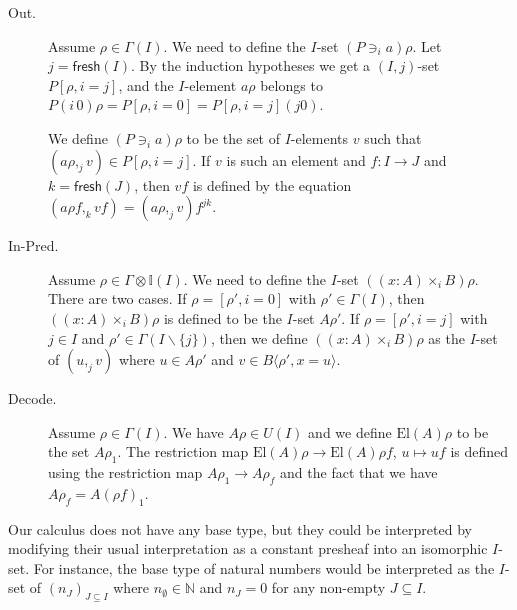 \documentclass[english]{PaperTools/latex/lipics}
\newcommand\CTimes[2]{(#2) ×_{#1}}
\newcommand\op[1]{∋_{#1}}
\def\fresh#1{\mathsf{fresh}(#1)}
\def\El#1{\mathrm{El}(#1)}
\begin{document}
\begin{description}
  \item[\sc Out.]
    Assume $ρ ∈ Γ(I)$. We need to define the $I$-set $(P \op {i} a)ρ$.
    Let $j = \fresh I$.
    By the induction hypotheses we get a $(I,j)$-set $P[ρ,i=j]$,
    and the $I$-element $aρ$ belongs to
    $P(i\,0)ρ = P[ρ,i=0] = P[ρ,i=j](j 0)$.

    We define $(P \op {i} a)ρ$ to be the set of $I$-elements $v$ such that
    $(aρ,_j v) ∈ P[ρ,i=j]$.
    If $v$ is such an element and $f : I → J$ and $k=\fresh J$, then
    $vf$ is defined by the equation $(aρf,_k vf) = (aρ ,_j v)f^{jk}$.


  \item[\sc In-Pred.]
    Assume $ρ ∈ Γ⊗𝕀(I)$.  We need to define the $I$-set $(\CTimes i {x:A} B)ρ$.
    There are two cases.
    If $ρ = [ρ',i=0]$ with $ρ' ∈ Γ(I)$, then $(\CTimes i {x:A} B)ρ$ is
    defined to be the $I$-set $Aρ'$.
    If $ρ = [ρ',i=j]$ with $j ∈ I$ and $ρ' ∈ Γ(I\backslash\{j\})$, then we define
    $(\CTimes i {x:A} B)ρ$ as the $I$-set of $(u ,_j v)$ where
    $u ∈ Aρ'$ and $v ∈ B⟨ρ',x=u⟩$.


  \item[\sc Decode.]
    Assume $ρ ∈ Γ(I)$.  We have $Aρ ∈ U(I)$ and we define
    $\El{A}ρ$ to be the set $Aρ_1$.
    The restriction map $\El{A}ρ → \El{A}ρf$, $u ↦ uf$ is defined
    using the restriction map $Aρ_1 → Aρ_f$ and the fact that we have
    $Aρ_f = A(ρf)_1$.
\end{description}

\begin{remark}
  Our calculus does not have any base type, but they could be interpreted
  by modifying their usual interpretation as a constant presheaf into an
  isomorphic $I$-set.
  For instance, the base type of natural numbers would be interpreted as
  the $I$-set of $(n_J)_{J ⊆ I}$ where $n_∅ ∈ ℕ$ and $n_J = 0$ for any
  non-empty $J ⊆ I$.
\end{remark}
\end{document}
